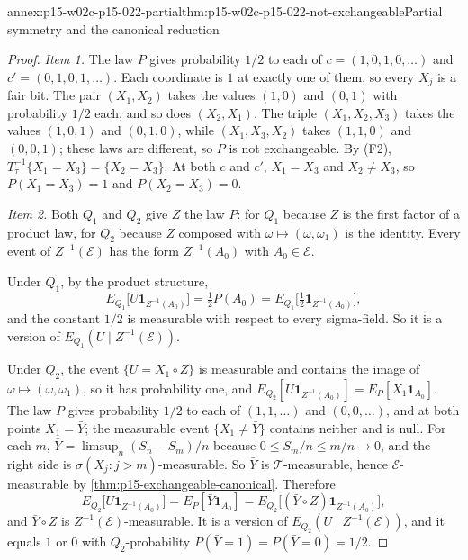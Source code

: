 \begin{annexitem}{annex:p15-w02c-p15-022-partial}{thm:p15-w02c-p15-022-not-exchangeable}{Partial symmetry and the canonical reduction}
\begin{proof}
\emph{Item 1.} The law \(P\) gives probability \(1/2\) to each of
\(c=(1,0,1,0,\ldots)\) and \(c'=(0,1,0,1,\ldots)\). Each coordinate is
\(1\) at exactly one of them, so every \(X_j\) is a fair bit. The pair
\((X_1,X_2)\) takes the values \((1,0)\) and \((0,1)\) with probability
\(1/2\) each, and so does \((X_2,X_1)\). The triple \((X_1,X_2,X_3)\)
takes the values \((1,0,1)\) and \((0,1,0)\), while \((X_1,X_3,X_2)\)
takes \((1,1,0)\) and \((0,0,1)\); these laws are different, so \(P\) is
not exchangeable. By (F2), \(T_\tau^{-1}\{X_1=X_3\}=\{X_2=X_3\}\). At
both \(c\) and \(c'\), \(X_1=X_3\) and \(X_2\neq X_3\), so
\(P(X_1=X_3)=1\) and \(P(X_2=X_3)=0\).

\emph{Item 2.} Both \(Q_1\) and \(Q_2\) give \(Z\) the law \(P\): for
\(Q_1\) because \(Z\) is the first factor of a product law, for \(Q_2\)
because \(Z\) composed with \(\omega\mapsto(\omega,\omega_1)\) is the
identity. Every event of \(Z^{-1}(\mathcal E)\) has the form
\(Z^{-1}(A_0)\) with \(A_0\in\mathcal E\).

Under \(Q_1\), by the product structure,
\[
 E_{Q_1}\bigl[U\mathbf1_{Z^{-1}(A_0)}\bigr]
   =\tfrac12P(A_0)
   =E_{Q_1}\bigl[\tfrac12\mathbf1_{Z^{-1}(A_0)}\bigr],
\]
and the constant \(1/2\) is measurable with respect to every
sigma-field. So it is a version of \(E_{Q_1}(U\mid Z^{-1}(\mathcal E))\).

Under \(Q_2\), the event \(\{U=X_1\circ Z\}\) is measurable and
contains the image of \(\omega\mapsto(\omega,\omega_1)\), so it has
probability one, and
\(E_{Q_2}[U\mathbf1_{Z^{-1}(A_0)}]=E_P[X_1\mathbf1_{A_0}]\). The law
\(P\) gives probability \(1/2\) to each of \((1,1,\ldots)\) and
\((0,0,\ldots)\), and at both points \(X_1=\bar Y\); the measurable event
\(\{X_1\neq\bar Y\}\) contains neither and is null. For each \(m\),
\(\bar Y=\limsup_n(S_n-S_m)/n\) because \(0\leq S_m/n\leq m/n\to0\), and
the right side is \(\sigma(X_j:j>m)\)-measurable. So \(\bar Y\) is
\(\mathcal T\)-measurable, hence \(\mathcal E\)-measurable by
\cref{thm:p15-exchangeable-canonical}. Therefore
\[
 E_{Q_2}\bigl[U\mathbf1_{Z^{-1}(A_0)}\bigr]
   =E_P[\bar Y\mathbf1_{A_0}]
   =E_{Q_2}\bigl[(\bar Y\circ Z)\mathbf1_{Z^{-1}(A_0)}\bigr],
\]
and \(\bar Y\circ Z\) is \(Z^{-1}(\mathcal E)\)-measurable. It is a
version of \(E_{Q_2}(U\mid Z^{-1}(\mathcal E))\), and it equals \(1\) or
\(0\) with \(Q_2\)-probability \(P(\bar Y=1)=P(\bar Y=0)=1/2\).
\end{proof}
\end{annexitem}

